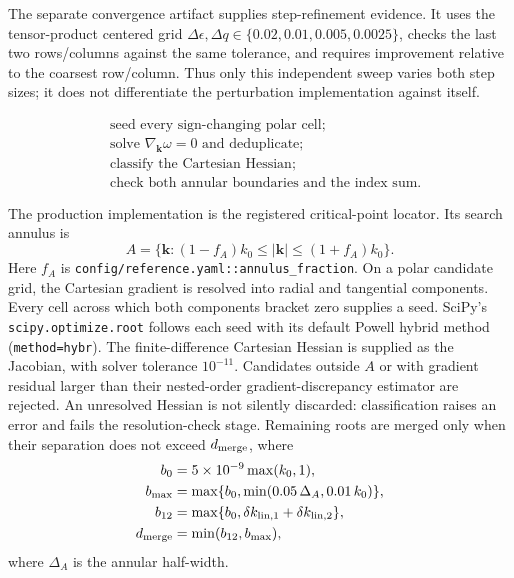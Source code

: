 The separate convergence artifact supplies step-refinement evidence.  It uses
the tensor-product centered grid
\(\Delta\epsilon,\Delta q\in\{0.02,0.01,0.005,0.0025\}\), checks the last two
rows/columns against the same tolerance, and requires improvement relative to
the coarsest row/column.  Thus only this independent sweep varies both step
sizes; it does not differentiate the perturbation implementation against
itself.

\begin{equation}
 \boxed{\begin{aligned}
 &\text{seed every sign-changing polar cell;}\\
 &\text{solve }\nabla_{\boldsymbol k}\omega=0\text{ and deduplicate;}\\
 &\text{classify the Cartesian Hessian;}\\
 &\text{check both annular boundaries and the index sum.}
 \end{aligned}}
 \label{alg:critical-point-search}
\end{equation}

The production implementation is the registered critical-point locator.  Its
search annulus is
\[
 A=\{\boldsymbol k:(1-f_A)k_0\leq|\boldsymbol k|
 \leq(1+f_A)k_0\}.
\]
Here \(f_A\) is \texttt{config/reference.yaml::annulus\_fraction}.  On a polar
candidate grid, the Cartesian gradient is resolved into radial and tangential
components.  Every cell across which both components bracket zero supplies a
seed.  SciPy's \texttt{scipy.optimize.root} follows each seed with its default
Powell hybrid method (\texttt{method=hybr}).  The finite-difference Cartesian
Hessian is supplied as the Jacobian, with solver tolerance
\(10^{-11}\).  Candidates outside \(A\) or with gradient residual larger
than their nested-order gradient-discrepancy estimator are rejected.  An unresolved
Hessian is not silently discarded: classification raises an error and fails
the resolution-check stage.  Remaining roots are merged only when their
separation does not exceed \(d_{\rm merge}\), where
\[
 \begin{aligned}
 b_0&=5\times10^{-9}\max(k_0,1),\\
 b_{\max}&=\max\{b_0,\min(0.05\,\Delta_A,0.01\,k_0)\},\\
 b_{12}&=\max\{b_0,\delta k_{{\rm lin},1}+\delta k_{{\rm lin},2}\},\\
 d_{\rm merge}&=\min(b_{12},b_{\max}),
 \end{aligned}
\]
where \(\Delta_A\) is the annular half-width.

